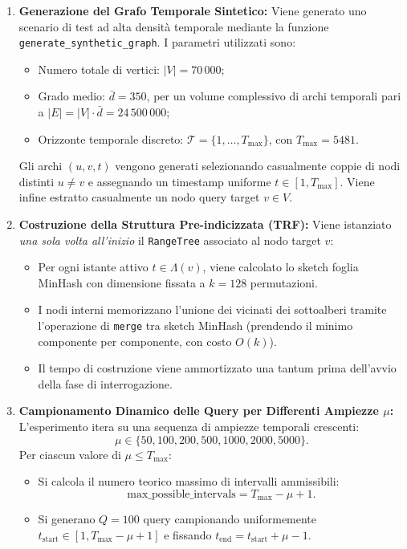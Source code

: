 \begin{enumerate}
    \item \textbf{Generazione del Grafo Temporale Sintetico:}
    Viene generato uno scenario di test ad alta densità temporale mediante la funzione \texttt{generate\_synthetic\_graph}. I parametri utilizzati sono:
    \begin{itemize}
        \item Numero totale di vertici: $|V| = 70\,000$;
        \item Grado medio: $\bar{d} = 350$, per un volume complessivo di archi temporali pari a $|E| = |V| \cdot \bar{d} = 24\,500\,000$;
        \item Orizzonte temporale discreto: $\mathcal{T} = \{1, \ldots, T_{\max}\}$, con $T_{\max} = 5481$.
    \end{itemize}
    Gli archi $(u, v, t)$ vengono generati selezionando casualmente coppie di nodi distinti $u \neq v$ e assegnando un timestamp uniforme $t \in [1, T_{\max}]$. Viene infine estratto casualmente un nodo query target $v \in V$.

    \item \textbf{Costruzione della Struttura Pre-indicizzata (TRF):}
    Viene istanziato \emph{una sola volta all'inizio} il \texttt{RangeTree} associato al nodo target $v$:
    \begin{itemize}
        \item Per ogni istante attivo $t \in \Lambda(v)$, viene calcolato lo sketch foglia MinHash con dimensione fissata a $k = 128$ permutazioni.
        \item I nodi interni memorizzano l'unione dei vicinati dei sottoalberi tramite l'operazione di \texttt{merge} tra sketch MinHash (prendendo il minimo componente per componente, con costo $O(k)$).
        \item Il tempo di costruzione viene ammortizzato una tantum prima dell'avvio della fase di interrogazione.
    \end{itemize}

    \item \textbf{Campionamento Dinamico delle Query per Differenti Ampiezze $\mu$:}
    L'esperimento itera su una sequenza di ampiezze temporali crescenti:
    \[
    \mu \in \{50, 100, 200, 500, 1000, 2000, 5000\}.
    \]
    Per ciascun valore di $\mu \le T_{\max}$:
    \begin{itemize}
        \item Si calcola il numero teorico massimo di intervalli ammissibili:
        \[
        \text{max\_possible\_intervals} = T_{\max} - \mu + 1.
        \]
        \item Si generano $Q = 100$ query campionando uniformemente $t_{\text{start}} \in [1, T_{\max} - \mu + 1]$ e fissando $t_{\text{end}} = t_{\text{start}} + \mu - 1$.
    \end{itemize}


\end{enumerate}
